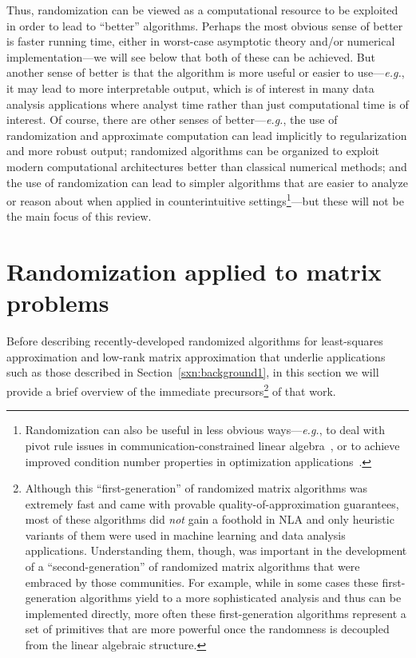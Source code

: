 \documentclass[twoside]{article}
\begin{document}
Thus, randomization can be viewed as a computational resource to be 
exploited in order to lead to ``better'' algorithms.
Perhaps the most obvious sense of better is faster running time, either
in worst-case asymptotic theory and/or numerical implementation---we will see below 
that both of these can be achieved.
But another sense of better is that the algorithm is more useful or easier 
to use---\emph{e.g.}, it may lead to more interpretable output, which is of 
interest in many data analysis applications where analyst time rather than 
just computational time is of interest.
Of course, there are other senses of better---\emph{e.g.}, the use of 
randomization and approximate computation can lead implicitly to 
regularization and more robust output;
randomized algorithms can be organized to exploit modern computational 
architectures better than classical numerical methods; and
the use of randomization can lead to simpler algorithms that are easier to 
analyze or reason about when applied in counterintuitive settings\footnote{Randomization can also be useful in less obvious 
ways---\emph{e.g.}, to deal with pivot rule issues in 
communication-constrained linear algebra~\cite{BDT08_TR}, or to achieve 
improved condition number properties in optimization 
applications~\cite{Asp08}.}---but these will not be the main focus of this review.




 \section{Randomization applied to matrix problems}
\label{sxn:background2}

Before describing recently-developed randomized algorithms for 
least-squares  approximation and low-rank matrix approximation that 
underlie applications such as those described in 
Section~\ref{sxn:background1}, in this section we will provide a brief 
overview of the immediate precursors\footnote{Although this ``first-generation'' of randomized matrix 
algorithms was extremely fast and came with provable 
quality-of-approximation guarantees, most of these algorithms did 
\emph{not} gain a foothold in NLA and only heuristic variants of them were 
used in machine learning and data analysis applications.
Understanding them, though, was important in the development of a 
``second-generation'' of randomized matrix algorithms that were embraced by 
those communities.
For example, while in some cases these first-generation algorithms yield 
to a more sophisticated analysis and thus can be implemented directly, more 
often these first-generation algorithms represent a set of primitives that 
are more powerful once the randomness is decoupled from the linear algebraic 
structure.}
of that work.
\end{document}
